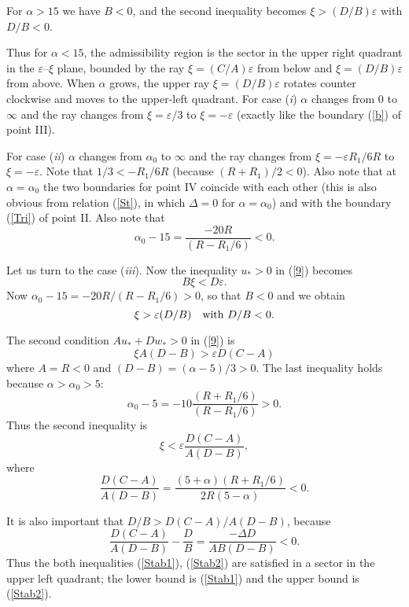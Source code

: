 \documentclass[12pt]{iopart}
\begin{document}
For $\alpha>15$ we have  $B<0$, and the second inequality becomes
$\xi> (D/B)\varepsilon$ with  $D/B<0$.



Thus for $\alpha<15$, the admissibility region is the sector in the
upper right quadrant in the $\varepsilon$--$\xi$ plane, bounded by the
ray $\xi= (C/A)\varepsilon$ from below and $\xi= (D/B)\varepsilon$ from above.
When $\alpha$ grows, the upper ray $\xi= (D/B)\varepsilon$ rotates counter
clockwise and moves to the upper-left quadrant.
For case ({\it i}) $\alpha$ changes from 0 to $\infty$ and the ray changes
from $\xi = \varepsilon/3$ to $\xi = - \varepsilon$ (exactly like the
boundary (\ref{b}) of point III).


For case ({\it ii}) $\alpha$ changes from $\alpha_{0}$ to $\infty$ and
the ray changes from $\xi = -\varepsilon R_{1}/6R$ to $\xi = - \varepsilon$.
Note that $1/3 < -R_{1}/6R $ (because $(R+R_{1})/2<0$). Also note that
at $\alpha=\alpha_{0}$ the two boundaries for point IV coincide with
each other (this is also obvious from relation (\ref{St}), in which
$\Delta=0$ for $\alpha=\alpha_{0}$) and with the boundary (\ref{Tri})
of point II.  Also note that
\begin{equation}
\alpha_{0}-15 = \frac{-20R}{(R-R_{1}/6)} <0.
\label{ak}
\end{equation}

Let us turn to the case ({\it iii}). Now the inequality
 $u_{*}>0$ in (\ref{9}) becomes
\[ B\xi <  D \varepsilon. \]
Now $\alpha_{0}-15 =  {-20R}/{(R-R_{1}/6)} >0$,
so that $B<0$ and we obtain
\begin{equation}
\xi > \varepsilon (D/B) \quad {\rm with}\  D/B<0.
\label{Stab1}
\end{equation}

The second condition $Au_{*}+Dw_{*}>0$ in (\ref{9}) is
\[ \xi A(D-B) > \varepsilon D(C-A) \]
where $A=R<0$ and $(D-B) = (\alpha-5)/3 >0$. The last inequality holds
because $\alpha>\alpha_{0}>5$:
\[ \alpha_{0}-5 = -10 \frac{(R+R_{1}/6)} {(R-R_{1}/6)}>0. \]
Thus the second inequality is
\begin{equation}
\xi < \varepsilon \frac{D(C-A)}{A(D-B)} ,
\label{Stab2}
\end{equation}
where
\begin{equation}
\frac{D(C-A)}{A(D-B)} =
\frac{(5+\alpha)(R+R_{1}/6)}{2R(5-\alpha)} <0.
\label{Bound2}
\end{equation}

It is also important that ${D}/{B} > {D(C-A)}/{A(D-B)}$, because
\begin{equation}
  \frac{D(C-A)}{A(D-B)} - \frac{D}{B} = \frac{-\Delta D}{AB(D-B)}<0.
\label{StM}
\end{equation}
Thus the both inequalities (\ref{Stab1}), (\ref{Stab2}) are satisfied
in a sector in the upper left quadrant; the lower bound is (\ref{Stab1})
and the upper bound is (\ref{Stab2}).
\end{document}
